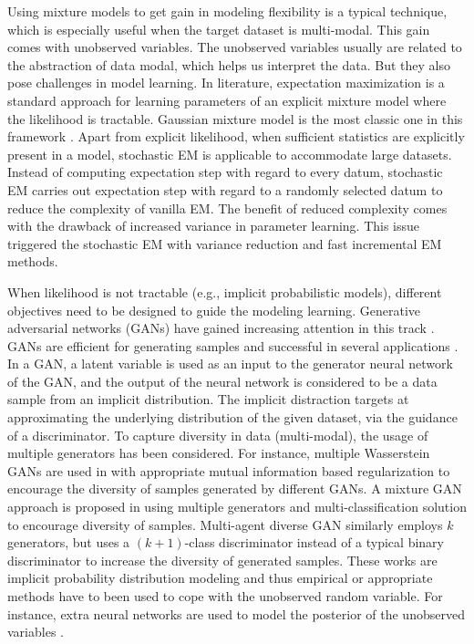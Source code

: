 Using mixture models to get gain in modeling flexibility is a typical technique, which is especially useful when the target dataset is multi-modal. This gain comes with unobserved variables. The unobserved variables usually are related to the abstraction of data modal, which helps us interpret the data. But they also pose challenges in model learning. In literature, expectation maximization \cite{dempster1977maximum} is a standard approach for learning parameters of an explicit mixture model where the likelihood is tractable. Gaussian mixture model is the most classic one in this framework \cite{Bishop:2006:PRM:1162264}.
Apart from explicit likelihood, when sufficient statistics are explicitly present in a model, stochastic EM \cite{cappe2009sem} is applicable to accommodate large datasets. Instead of computing expectation step with regard to every datum, stochastic EM carries out expectation step with regard to a randomly selected datum to reduce the complexity of vanilla EM. The benefit of reduced complexity comes with the drawback of increased variance in parameter learning. This issue triggered the stochastic EM with variance reduction\cite{chen2018emvr} and fast incremental EM \cite{karimi2019incrementalEM} methods.


When likelihood is not tractable (e.g., implicit probabilistic models), different objectives need to be designed to guide the modeling learning. Generative adversarial networks (GANs) have gained increasing attention in this track \cite{NIPS2014_5423, NIPS2016_6125, 2018arXiv180508318Z, salimans2018improving}.
GANs are efficient for generating samples and successful in several applications \cite{ledig2017photo, NIPS2016_6125}. In a GAN, a latent variable is used as
an input to the generator neural network of the GAN, and the output of the neural network is considered to be a data sample from an implicit distribution. The implicit distraction targets at approximating the underlying distribution of the given dataset, via the guidance of a discriminator.
To capture diversity in data (multi-modal), the usage of multiple generators has been considered. For instance, multiple Wasserstein GANs \cite{2017arXiv170107875A} are used in \cite{2018arXiv180600880K} with appropriate mutual information based regularization to encourage the diversity of samples generated by different GANs.
A mixture GAN approach is proposed in \cite{hoang2018mgan} using multiple generators and multi-classification solution to
encourage diversity of samples. Multi-agent diverse GAN \cite{DBLP:journals/corr/GhoshKNTD17} similarly employs $k$ generators, but uses a $(k+1)$-class discriminator instead of a typical binary discriminator to increase the diversity of generated samples. These works are implicit probability distribution modeling and thus empirical or appropriate methods have to been used to cope with the unobserved random variable. For instance, extra neural networks are used to model the posterior of the unobserved variables \cite{donahue2017adversarial, dumoulin2017adversarially}. 


